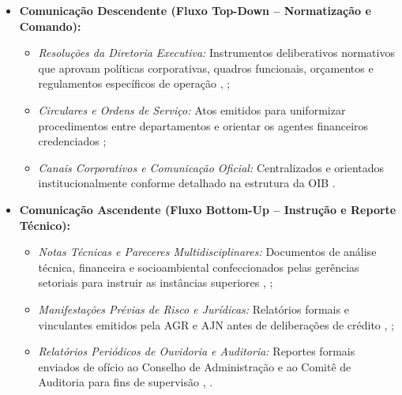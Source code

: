 \begin{itemize}
    \item \textbf{Comunicação Descendente (Fluxo Top-Down -- Normatização e Comando):}
          \begin{itemize}
              \item \emph{Resoluções da Diretoria Executiva:} Instrumentos deliberativos normativos que aprovam políticas corporativas, quadros funcionais, orçamentos e regulamentos específicos de operação \cite[arts.~43,~II e 78]{bndes2025estatuto}, \cite[p.~11]{bndes2026oib};
              \item \emph{Circulares e Ordens de Serviço:} Atos emitidos para uniformizar procedimentos entre departamentos e orientar os agentes financeiros credenciados \cite[p.~44, 172]{bndes2026oib};
              \item \emph{Canais Corporativos e Comunicação Oficial:} Centralizados e orientados institucionalmente conforme detalhado na estrutura da OIB \cite[p.~14, 19]{bndes2026oib}.
          \end{itemize}

    \item \textbf{Comunicação Ascendente (Fluxo Bottom-Up -- Instrução e Reporte Técnico):}
          \begin{itemize}
              \item \emph{Notas Técnicas e Pareceres Multidisciplinares:} Documentos de análise técnica, financeira e socioambiental confeccionados pelas gerências setoriais para instruir as instâncias superiores \cite[art.~7º,~I]{bndes2025estatuto}, \cite[p.~45, 63]{bndes2026oib};
              \item \emph{Manifestações Prévias de Risco e Jurídicas:} Relatórios formais e vinculantes emitidos pela AGR e AJN antes de deliberações de crédito \cite[art.~74]{bndes2025estatuto}, \cite[p.~35, 171--173]{bndes2026oib};
              \item \emph{Relatórios Periódicos de Ouvidoria e Auditoria:} Reportes formais enviados de ofício ao Conselho de Administração e ao Comitê de Auditoria para fins de supervisão \cite[arts.~57,~XXI e 75]{bndes2025estatuto}, \cite[p.~14, 27]{bndes2026oib}.
          \end{itemize}


\end{itemize}
